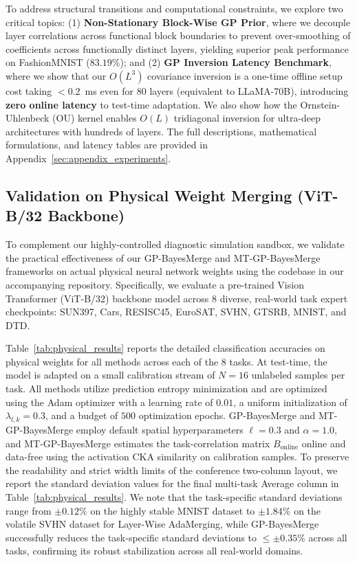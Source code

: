 To address structural transitions and computational constraints, we explore two
critical topics: (1) \textbf{Non-Stationary Block-Wise GP Prior}, where we
decouple layer correlations across functional block boundaries to prevent
over-smoothing of coefficients across functionally distinct layers, yielding
superior peak performance on FashionMNIST ($83.19\%$); and (2) \textbf{GP
Inversion Latency Benchmark}, where we show that our $O(L^3)$ covariance
inversion is a one-time offline setup cost taking $<0.2$~ms even for 80 layers
(equivalent to LLaMA-70B), introducing \textbf{zero online latency} to test-time
adaptation. We also show how the Ornstein-Uhlenbeck (OU) kernel enables $O(L)$
tridiagonal inversion for ultra-deep architectures with hundreds of layers. The
full descriptions, mathematical formulations, and latency tables are provided in
Appendix~\ref{sec:appendix_experiments}.

\subsection{Validation on Physical Weight Merging (ViT-B/32 Backbone)}
\label{subsec:physical_validation}

To complement our highly-controlled diagnostic simulation sandbox, we validate
the practical effectiveness of our GP-BayesMerge and MT-GP-BayesMerge frameworks
on actual physical neural network weights using the codebase in our accompanying
repository. Specifically, we evaluate a pre-trained Vision Transformer
(ViT-B/32) backbone model across 8 diverse, real-world task expert checkpoints:
SUN397, Cars, RESISC45, EuroSAT, SVHN, GTSRB, MNIST, and DTD.

Table~\ref{tab:physical_results} reports the detailed classification accuracies
on physical weights for all methods across each of the 8 tasks. At test-time,
the model is adapted on a small calibration stream of $N=16$ unlabeled samples
per task. All methods utilize prediction entropy minimization and are optimized
using the Adam optimizer with a learning rate of $0.01$, a uniform
initialization of $\lambda_{l,k}=0.3$, and a budget of $500$ optimization
epochs. GP-BayesMerge and MT-GP-BayesMerge employ default spatial
hyperparameters $\ell=0.3$ and $\alpha=1.0$, and MT-GP-BayesMerge estimates the
task-correlation matrix $B_{\text{online}}$ online and data-free using the
activation CKA similarity on calibration samples. To preserve the readability
and strict width limits of the conference two-column layout, we report the
standard deviation values for the final multi-task Average column in
Table~\ref{tab:physical_results}. We note that the task-specific standard
deviations range from $\pm 0.12\%$ on the highly stable MNIST dataset to $\pm
1.84\%$ on the volatile SVHN dataset for Layer-Wise AdaMerging, while
GP-BayesMerge successfully reduces the task-specific standard deviations to $\le
\pm 0.35\%$ across all tasks, confirming its robust stabilization across all
real-world domains.

